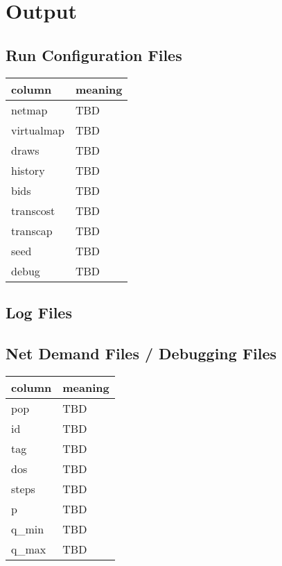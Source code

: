 \documentclass[12pt]{article}
\begin{document}
\section{Output}

\subsection{Run Configuration Files}

\begin{tabular} {| l | l |}
    \hline
    \textbf{column} & \textbf{meaning} \\ \hline
    netmap & TBD \\ \hline
    virtualmap & TBD \\ \hline
    draws & TBD \\ \hline
    history & TBD \\ \hline
    bids & TBD \\ \hline
    transcost & TBD \\ \hline
    transcap & TBD \\ \hline
    seed & TBD \\ \hline
    debug & TBD \\ \hline
\end{tabular}

\subsection{Log Files}

\subsection{Net Demand Files / Debugging Files}

\begin{tabular} {| l | l |}
    \hline
    \textbf{column} & \textbf{meaning} \\ \hline
    pop & TBD \\ \hline
    id & TBD \\ \hline
    tag & TBD \\ \hline
    dos & TBD \\ \hline
    steps & TBD \\ \hline
    p & TBD \\ \hline
    q\_min & TBD \\ \hline
    q\_max & TBD \\ \hline
\end{tabular}
\end{document}
